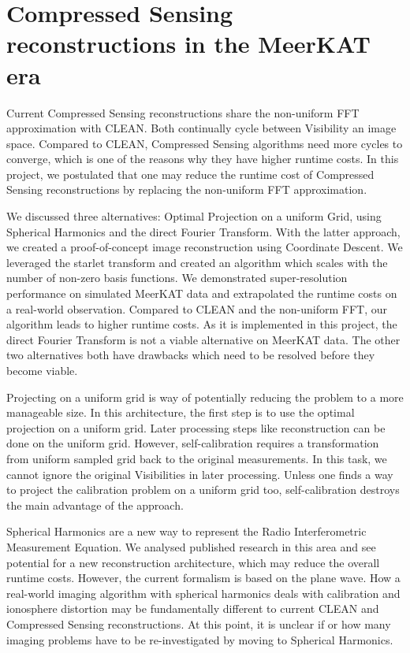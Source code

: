 \section{Compressed Sensing reconstructions in the MeerKAT era}
Current Compressed Sensing reconstructions share the non-uniform FFT approximation with CLEAN. Both continually cycle between Visibility an image space. Compared to CLEAN, Compressed Sensing algorithms need more cycles to converge, which is one of the reasons why they have higher runtime costs. In this project, we postulated that one may reduce the runtime cost of Compressed Sensing reconstructions by replacing the non-uniform FFT approximation. 

We discussed three alternatives: Optimal Projection on a uniform Grid, using Spherical Harmonics and the direct Fourier Transform. With the latter approach, we created a proof-of-concept image reconstruction using  Coordinate Descent. We leveraged the starlet transform and created an algorithm which scales with the number of non-zero basis functions. We demonstrated super-resolution performance on simulated MeerKAT data and extrapolated the runtime costs on a real-world observation. Compared to CLEAN and the non-uniform FFT, our algorithm leads to higher runtime costs. As it is implemented in this project, the direct Fourier Transform is not a viable alternative on MeerKAT data. The other two alternatives both have drawbacks which need to be resolved before they become viable.

Projecting on a uniform grid is way of potentially reducing the problem to a more manageable size. In this architecture, the first step is to use the optimal projection on a uniform grid. Later processing steps like reconstruction can be done on the uniform grid. However, self-calibration requires a transformation from uniform sampled grid back to the original measurements. In this task, we cannot ignore the original Visibilities in later processing. Unless one finds a way to project the calibration problem on a uniform grid too, self-calibration destroys the main advantage of the approach.

Spherical Harmonics are a new way to represent the Radio Interferometric Measurement Equation. We analysed published research in this area\cite{carozzi2015imaging, mcewen2008simulating} and see potential for a new reconstruction architecture, which may reduce the overall runtime costs. However, the current formalism\cite{smirnov2011revisiting} is based on the plane wave. How a real-world imaging algorithm with spherical harmonics deals with calibration and ionosphere distortion may be fundamentally different to current CLEAN and Compressed Sensing reconstructions. At this point, it is unclear if or how many imaging problems have to be re-investigated by moving to Spherical Harmonics.





